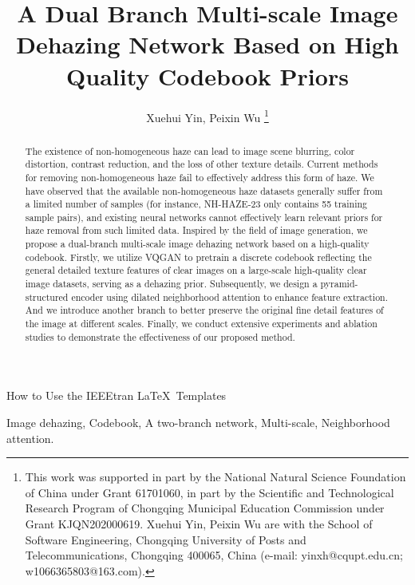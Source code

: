 \documentclass[lettersize,journal]{IEEEtran}
\begin{document}
\title{A Dual Branch Multi-scale Image Dehazing Network Based on High Quality Codebook Priors}
\author{Xuehui Yin, Peixin Wu
\thanks{This work was supported in part by the National Natural Science Foundation of China under Grant 61701060, in part by the Scientific and Technological Research Program of Chongqing Municipal Education Commission under Grant KJQN202000619.
Xuehui Yin, Peixin Wu are with the School of Software Engineering, Chongqing University of Posts and Telecommunications, Chongqing 400065, China (e-mail: yinxh@cqupt.edu.cn; w1066365803@163.com).
}}

%
{How to Use the IEEEtran \LaTeX \ Templates}

\maketitle

\begin{abstract}
The existence of non-homogeneous haze can lead to image scene blurring, color distortion, contrast reduction, and the loss of other texture details. Current methods for removing non-homogeneous haze fail to effectively address this form of haze. We have observed that the available non-homogeneous haze datasets generally suffer from a limited number of samples (for instance, NH-HAZE-23 only contains 55 training sample pairs), and existing neural networks cannot effectively learn relevant priors for haze removal from such limited data. Inspired by the field of image generation, we propose a dual-branch multi-scale image dehazing network based on a high-quality codebook. Firstly, we utilize VQGAN to pretrain a discrete codebook reflecting the general detailed texture features of clear images on a large-scale high-quality clear image datasets, serving as a dehazing prior. Subsequently, we design a pyramid-structured encoder using dilated neighborhood attention to enhance feature extraction. And we introduce another branch to better preserve the original fine detail features of the image at different scales. Finally, we conduct extensive experiments and ablation studies to demonstrate the effectiveness of our proposed method.
\end{abstract}

\begin{IEEEkeywords}
Image dehazing, Codebook, A two-branch network, Multi-scale, Neighborhood attention.
\end{IEEEkeywords}
\end{document}
